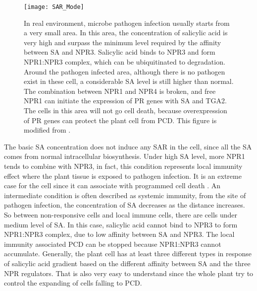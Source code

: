 \begin{figure}
	\centering
	\texttt{[image: SAR\_Mode]}
	\caption{In real environment, microbe pathogen infection usually starts from a very small area. In this area, the concentration of salicylic acid is very high and surpass the minimum level required by the affinity between SA and NPR3. Salicylic acid binds to NPR3 and form NPR1:NPR3 complex, which can be ubiquitinated to degradation. Around the pathogen infected area, although there is no pathogen exist in these cell, a considerable SA level is still higher than normal. The combination between NPR1 and NPR4 is broken, and free NPR1 can initiate the expression of PR genes with SA and TGA2. The cells in this area will not go cell death, because overexpression of PR genes can protect the plant cell from PCD. This figure is modified from \citep{gust2012plant}.}
\end{figure}
The basic SA concentration does not induce any SAR in the cell, since all the SA comes from normal intracellular biosynthesis. Under high SA level, more NPR1 tends to combine with NPR3, in fact, this condition represents local immunity effect where the plant tissue is exposed to pathogen infection. It is an extreme case for the cell since it can associate with programmed cell death \citep{morel1997hypersensitive}. An intermediate condition is often described as systemic immunity, from the site of pathogen infection, the concentration of SA decreases as the distance increases. So between non-responsive cells and local immune cells, there are cells under medium level of SA. In this case, salicylic acid cannot bind to NPR3 to form NPR1:NPR3 complex, due to low affinity between SA and NPR3. The local immunity associated PCD can be stopped because NPR1:NPR3 cannot accumulate. Generally, the plant cell has at least three different types in response of salicylic acid gradient based on the different affinity between SA and the three NPR regulators. That is also very easy to understand since the whole plant try to control the expanding of cells falling to PCD.\\
